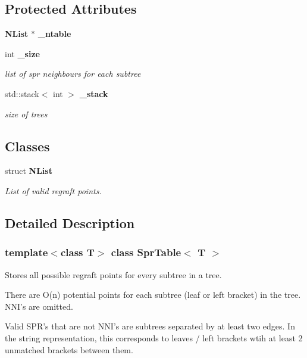 \subsection*{Protected Attributes}
\begin{CompactItemize}
\item 
{\bf NList} $\ast$ {\bf \_\-ntable}
\item 
int {\bf \_\-size}
\begin{CompactList}\small\item\em list of spr neighbours for each subtree \item\end{CompactList}\item 
std::stack$<$ int $>$ {\bf \_\-stack}
\begin{CompactList}\small\item\em size of trees \item\end{CompactList}\end{CompactItemize}
\subsection*{Classes}
\begin{CompactItemize}
\item 
struct {\bf NList}
\begin{CompactList}\small\item\em List of valid regraft points. \item\end{CompactList}\end{CompactItemize}


\subsection{Detailed Description}
\subsubsection*{template$<$class T$>$ class Spr\-Table$<$ T $>$}

Stores all possible regraft points for every subtree in a tree. 

There are O(n) potential points for each subtree (leaf or left bracket) in the tree. NNI's are omitted.

Valid SPR's that are not NNI's are subtrees separated by at least two edges. In the string representation, this corresponds to leaves / left brackets wtih at least 2 unmatched brackets between them. 



